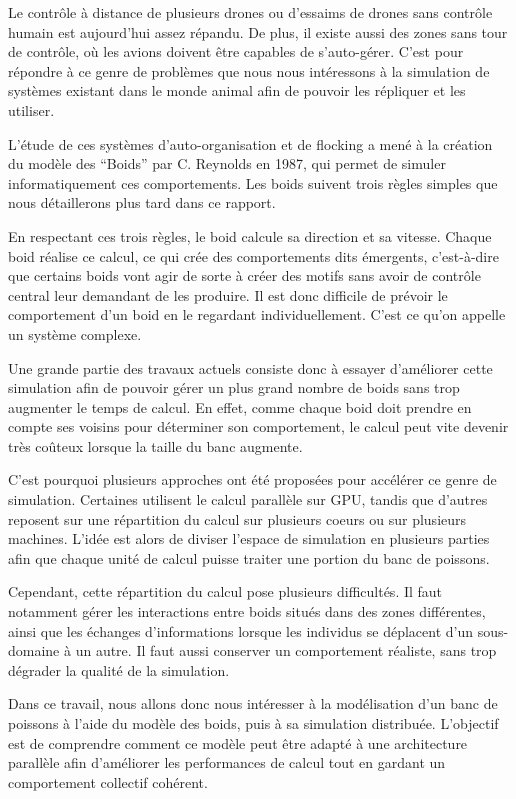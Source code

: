 \documentclass[conference]{IEEEtran}
\begin{document}
Le contrôle à distance de plusieurs drones ou d'essaims de drones sans contrôle humain est aujourd'hui assez répandu. De plus, il existe aussi des zones sans tour de contrôle, où les avions doivent être capables de s'auto-gérer. C'est pour répondre à ce genre de problèmes que nous nous intéressons à la simulation de systèmes existant dans le monde animal afin de pouvoir les répliquer et les utiliser.

L'étude de ces systèmes d'auto-organisation et de flocking a mené à la création du modèle des “Boids” par C. Reynolds en 1987, qui permet de simuler informatiquement ces comportements. Les boids suivent trois règles simples que nous détaillerons plus tard dans ce rapport.

En respectant ces trois règles, le boid calcule sa direction et sa vitesse. Chaque boid réalise ce calcul, ce qui crée des comportements dits émergents, c'est-à-dire que certains boids vont agir de sorte à créer des motifs sans avoir de contrôle central leur demandant de les produire. Il est donc difficile de prévoir le comportement d'un boid en le regardant individuellement. C'est ce qu'on appelle un système complexe.

Une grande partie des travaux actuels consiste donc à essayer d'améliorer cette simulation afin de pouvoir gérer un plus grand nombre de boids sans trop augmenter le temps de calcul. En effet, comme chaque boid doit prendre en compte ses voisins pour déterminer son comportement, le calcul peut vite devenir très coûteux lorsque la taille du banc augmente.

C'est pourquoi plusieurs approches ont été proposées pour accélérer ce genre de simulation. Certaines utilisent le calcul parallèle sur GPU, tandis que d'autres reposent sur une répartition du calcul sur plusieurs coeurs ou sur plusieurs machines. L'idée est alors de diviser l'espace de simulation en plusieurs parties afin que chaque unité de calcul puisse traiter une portion du banc de poissons.

Cependant, cette répartition du calcul pose plusieurs difficultés. Il faut notamment gérer les interactions entre boids situés dans des zones différentes, ainsi que les échanges d'informations lorsque les individus se déplacent d'un sous-domaine à un autre. Il faut aussi conserver un comportement réaliste, sans trop dégrader la qualité de la simulation.

Dans ce travail, nous allons donc nous intéresser à la modélisation d’un banc de poissons à l’aide du modèle des boids, puis à sa simulation distribuée. L’objectif est de comprendre comment ce modèle peut être adapté à une architecture parallèle afin d’améliorer les performances de calcul tout en gardant un comportement collectif cohérent.
\end{document}
